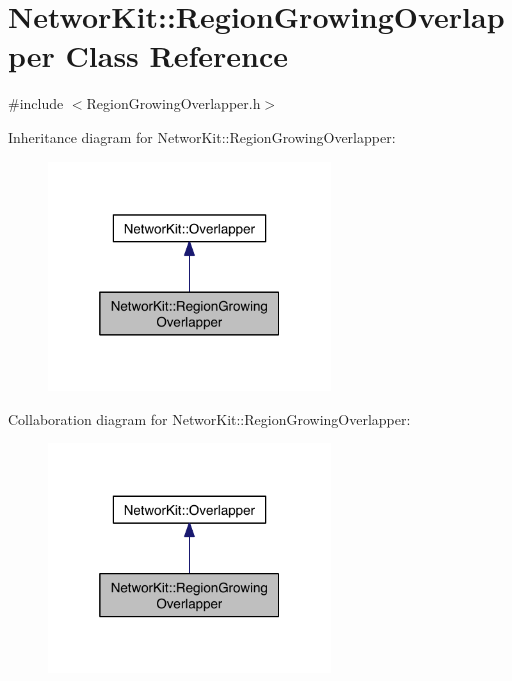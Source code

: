 \hypertarget{class_networ_kit_1_1_region_growing_overlapper}{\section{Networ\-Kit\-:\-:Region\-Growing\-Overlapper Class Reference}
\label{class_networ_kit_1_1_region_growing_overlapper}
}


{\ttfamily \#include $<$Region\-Growing\-Overlapper.\-h$>$}



Inheritance diagram for Networ\-Kit\-:\-:Region\-Growing\-Overlapper\-:\nopagebreak
\begin{figure}[H]
\begin{center}
\leavevmode
\includegraphics[width=212pt]{class_networ_kit_1_1_region_growing_overlapper__inherit__graph}
\end{center}
\end{figure}


Collaboration diagram for Networ\-Kit\-:\-:Region\-Growing\-Overlapper\-:\nopagebreak
\begin{figure}[H]
\begin{center}
\leavevmode
\includegraphics[width=212pt]{class_networ_kit_1_1_region_growing_overlapper__coll__graph}
\end{center}
\end{figure}
